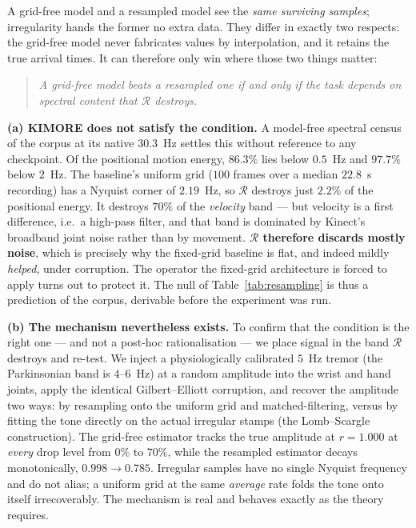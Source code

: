 \documentclass[10pt,journal]{IEEEtran}
\begin{document}
A grid-free model and a resampled model see the \emph{same surviving samples}; irregularity hands
the former no extra data. They differ in exactly two respects: the grid-free model never fabricates
values by interpolation, and it retains the true arrival times. It can therefore only win where
those two things matter:
%
\begin{quote}
\emph{A grid-free model beats a resampled one if and only if the task depends on spectral content
that $\mathcal{R}$ destroys.}
\end{quote}

\textbf{(a) KIMORE does not satisfy the condition.} A model-free spectral census of the corpus at
its native $30.3$~Hz settles this without reference to any checkpoint. Of the positional motion
energy, $86.3\%$ lies below $0.5$~Hz and $97.7\%$ below $2$~Hz. The baseline's uniform grid ($100$
frames over a median $22.8$~s recording) has a Nyquist corner of $2.19$~Hz, so $\mathcal{R}$ destroys
just $\mathbf{2.2\%}$ of the positional energy. It destroys $70\%$ of the \emph{velocity} band --- but
velocity is a first difference, i.e.\ a high-pass filter, and that band is dominated by Kinect's
broadband joint noise rather than by movement. \textbf{$\mathcal{R}$ therefore discards mostly noise},
which is precisely why the fixed-grid baseline is flat, and indeed mildly \emph{helped}, under
corruption. The operator the fixed-grid architecture is forced to apply turns out to protect it. The
null of Table~\ref{tab:resampling} is thus a prediction of the corpus, derivable before the
experiment was run.

\textbf{(b) The mechanism nevertheless exists.} To confirm that the condition is the right one --- and
not a post-hoc rationalisation --- we place signal in the band $\mathcal{R}$ destroys and re-test. We
inject a physiologically calibrated $5$~Hz tremor (the Parkinsonian band is $4$--$6$~Hz) at a random
amplitude into the wrist and hand joints, apply the identical Gilbert--Elliott corruption, and
recover the amplitude two ways: by resampling onto the uniform grid and matched-filtering, versus by
fitting the tone directly on the actual irregular stamps (the Lomb--Scargle construction). The
grid-free estimator tracks the true amplitude at $r=\mathbf{1.000}$ at \emph{every} drop level from
$0\%$ to $70\%$, while the resampled estimator decays monotonically, $0.998\!\to\!0.785$. Irregular
samples have no single Nyquist frequency and do not alias; a uniform grid at the same \emph{average}
rate folds the tone onto itself irrecoverably. The mechanism is real and behaves exactly as the theory
requires.
\end{document}
